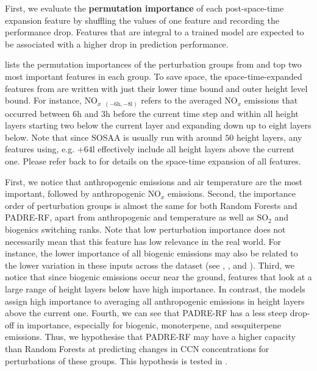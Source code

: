 \noindent First, we evaluate the \textbf{permutation importance} of each post-space-time expansion feature by shuffling the values of one feature and recording the performance drop. Features that are integral to a trained model are expected to be associated with a higher drop in prediction performance.

 lists the permutation importances of the perturbation groups from  and top two most important features in each group. To save space, the space-time-expanded features from  are written with just their lower time bound and outer height level bound. For instance, $\text{NO}_{x}$ $_{(-6\text{h},-8\text{l})}$ refers to the averaged $\text{NO}_{x}$ emissions that occurred between $6\text{h}$ and $3\text{h}$ before the current time step and within all height layers starting two below the current layer and expanding down up to eight layers below. Note that since SOSAA is usually run with around $50$ height layers, any features using, e.g. $+64\text{l}$ effectively include all height layers above the current one. Please refer back to  for details on the space-time expansion of all features.

First, we notice that anthropogenic emissions and air temperature are the most important, followed by anthropogenic $\text{NO}_{x}$ emissions. Second, the importance order of perturbation groups is almost the same for both Random Forests and PADRE-RF, apart from anthropogenic and temperature as well as $\text{SO}_2$ and biogenics switching ranks. Note that low perturbation importance does not necessarily mean that this feature has low relevance in the real world. For instance, the lower importance of all biogenic emissions may also be related to the lower variation in these inputs across the dataset (see , , and ). Third, we notice that since biogenic emissions occur near the ground, features that look at a large range of height layers below have high importance. In contrast, the models assign high importance to averaging all anthropogenic emissions in height layers above the current one. Fourth, we can see that PADRE-RF has a less steep drop-off in importance, especially for biogenic, monoterpene, and sesquiterpene emissions. Thus, we hypothesise that PADRE-RF may have a higher capacity than Random Forests at predicting changes in CCN concentrations for perturbations of these groups. This hypothesis is tested in .


